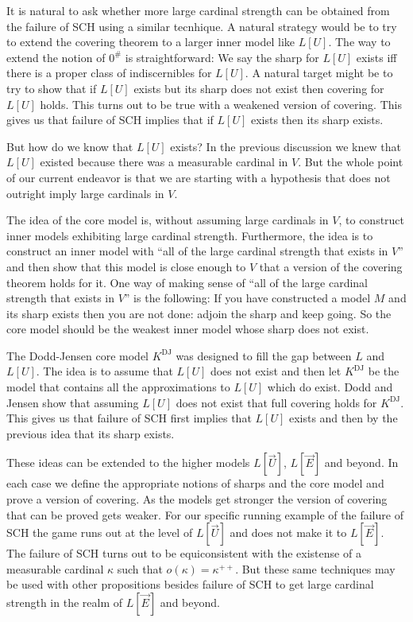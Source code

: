 \documentclass[oneside,12pt]{amsart}
\begin{document}
It is natural to ask whether more large cardinal strength can be obtained from
the failure of SCH using a similar tecnhique. A natural strategy would be
to try to extend the covering theorem to a larger inner model like $L[U]$.
The way to extend the notion of $0^{\#}$ is straightforward: We say the sharp for
$L[U]$ exists iff there is a proper class of indiscernibles for $L[U]$. A natural
target might be to try to show that if $L[U]$ exists but
its sharp does not exist then covering for $L[U]$ holds. This turns out to be
true with a weakened version of covering. This gives us that failure of SCH
implies that if $L[U]$ exists then its sharp exists.

But how do we know that $L[U]$ exists? In the previous
discussion we knew that $L[U]$ existed because there was a measurable cardinal
in $V$. But the whole point of our current endeavor is that we are starting
with a hypothesis that does not outright imply large cardinals in $V$.

The idea of the core model is, without assuming large cardinals in $V$, to
construct inner models exhibiting large cardinal strength. Furthermore, the
idea is to construct an inner model with ``all of the large cardinal strength
that exists in $V$'' and then show that this model is close enough to $V$ that
a version of the covering theorem holds for it. One way of making sense
of ``all of the large cardinal strength that exists in $V$'' is the following:
If you have constructed a model $M$ and its sharp exists then you are not done:
adjoin the sharp and keep going. So the core model should be the weakest inner
model whose sharp does not exist.

The Dodd-Jensen core model $K^{\text{DJ}}$ was designed to fill the gap between $L$ and
$L[U]$. The idea is to assume that $L[U]$ does not exist and then let $K^{\text{DJ}}$
be the model that contains all the approximations to $L[U]$ which do exist.
Dodd and Jensen show that assuming $L[U]$ does not exist that full covering
holds for $K^{\text{DJ}}$. This gives us that failure of SCH first implies
that $L[U]$ exists and then by the previous idea that its sharp exists.

These ideas can be extended to the higher models $L[\vec{U}]$, $L[\vec{E}]$
and beyond. In each case we define the appropriate notions of sharps and
the core model and prove a version of covering. As the models get stronger
the version of covering that can be proved gets weaker. For our specific
running example of the failure of SCH the game runs out at the level of
$L[\vec{U}]$ and does not make it to $L[\vec{E}]$. The failure of SCH turns
out to be equiconsistent with the existense of a measurable cardinal $\kappa$
such that $o(\kappa) = \kappa^{++}$. But these same techniques may be used
with other propositions besides failure of SCH to get large cardinal strength in the realm of
$L[\vec{E}]$ and beyond.




\end{document}
